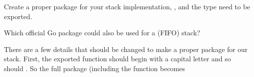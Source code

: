 \begin{Exercise}[title={Stack as package},difficulty=2]
\label{ex:stack-package}
\Question\label{ex:stack-package q1} Create a proper package for your
stack implementation, ,  and the  type need to be
exported.

\Question\label{ex:stack-package q2} Which official Go package could
also be used for a (FIFO) stack?

\end{Exercise}

\begin{Answer}
\Question There are a few details that should be changed to make a proper package
for our stack. First, the exported function should begin with a capital 
letter and so should . So the full package (including the
 function becomes


\end{Answer}
